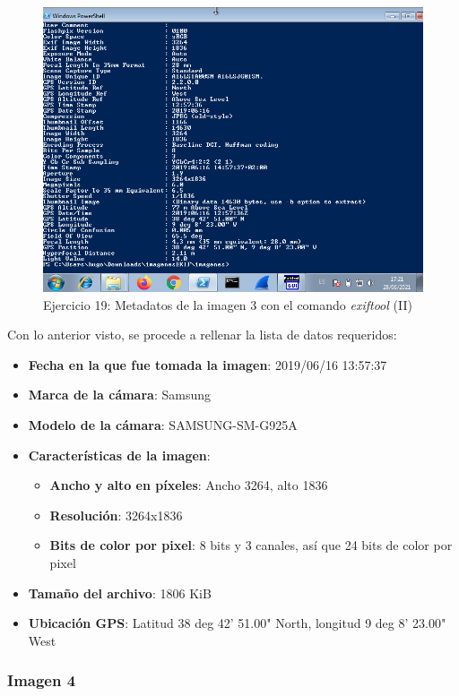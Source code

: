 \documentclass[11pt]{article}
\begin{document}
\begin{figure}[H]
    \caption{Ejercicio 19: Metadatos de la imagen 3 con el comando \textit{exiftool} (II)}
    \centering
    \includegraphics[scale=0.7]{p03/e19-8.png}
\end{figure}

Con lo anterior visto, se procede a rellenar la lista de datos requeridos:

\begin{itemize}
    \item \textbf{Fecha en la que fue tomada la imagen}: 2019/06/16 13:57:37
    \item \textbf{Marca de la cámara}: Samsung
    \item \textbf{Modelo de la cámara}: SAMSUNG-SM-G925A
    \item \textbf{Características de la imagen}:
        \begin{itemize}
            \item \textbf{Ancho y alto en píxeles}: Ancho 3264, alto 1836
            \item \textbf{Resolución}: 3264x1836
            \item \textbf{Bits de color por pixel}: 8 bits y 3 canales, así que 24 bits de color por pixel
        \end{itemize}
    \item \textbf{Tamaño del archivo}: 1806 KiB
    \item \textbf{Ubicación GPS}: Latitud 38 deg 42' 51.00" North, longitud 9 deg 8' 23.00" West
\end{itemize}

\subsubsection{Imagen 4}
\end{document}
